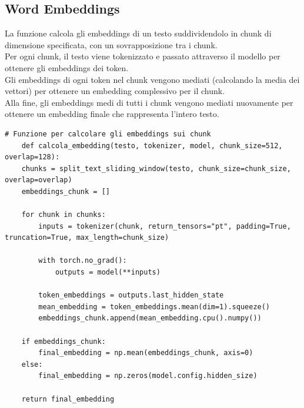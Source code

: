 \documentclass{article}
\begin{document}
		\subsection{Word Embeddings}
La funzione calcola gli embeddings di un testo suddividendolo in chunk di dimensione specificata, con un sovrapposizione tra i chunk. \\Per ogni chunk, il testo viene tokenizzato e passato attraverso il modello per ottenere gli embeddings dei token. \\Gli embeddings di ogni token nel chunk vengono mediati (calcolando la media dei vettori) per ottenere un embedding complessivo per il chunk.\\ Alla fine, gli embeddings medi di tutti i chunk vengono mediati nuovamente per ottenere un embedding finale che rappresenta l'intero testo.		
	\begin{lstlisting}
# Funzione per calcolare gli embeddings sui chunk
	def calcola_embedding(testo, tokenizer, model, chunk_size=512, overlap=128):
	chunks = split_text_sliding_window(testo, chunk_size=chunk_size, overlap=overlap)
	embeddings_chunk = []
	
	for chunk in chunks:
		inputs = tokenizer(chunk, return_tensors="pt", padding=True, truncation=True, max_length=chunk_size)

		with torch.no_grad():
			outputs = model(**inputs)

		token_embeddings = outputs.last_hidden_state
		mean_embedding = token_embeddings.mean(dim=1).squeeze()
		embeddings_chunk.append(mean_embedding.cpu().numpy())

	if embeddings_chunk:
		final_embedding = np.mean(embeddings_chunk, axis=0)
	else:
		final_embedding = np.zeros(model.config.hidden_size)
		
	return final_embedding
	\end{lstlisting}
	\newpage	
\end{document}
